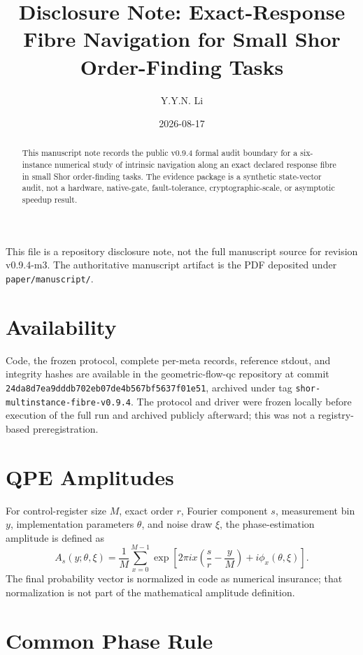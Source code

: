 \documentclass[11pt]{article}
\title{Disclosure Note: Exact-Response Fibre Navigation for Small Shor Order-Finding Tasks}
\author{Y.Y.N. Li}
\date{2026-08-17}
\begin{document}
\maketitle

\noindent This file is a repository disclosure note, not the full manuscript
source for revision v0.9.4-m3. The authoritative manuscript artifact is the
PDF deposited under \texttt{paper/manuscript/}.

\begin{abstract}
This manuscript note records the public v0.9.4 formal audit boundary for a
six-instance numerical study of intrinsic navigation along an exact declared
response fibre in small Shor order-finding tasks. The evidence package is a
synthetic state-vector audit, not a hardware, native-gate, fault-tolerance,
cryptographic-scale, or asymptotic speedup result.
\end{abstract}

\section{Availability}

Code, the frozen protocol, complete per-meta records, reference stdout, and
integrity hashes are available in the geometric-flow-qc repository at commit
\texttt{24da8d7ea9dddb702eb07de4b567bf5637f01e51}, archived under tag
\texttt{shor-multinstance-fibre-v0.9.4}. The protocol and driver were frozen
locally before execution of the full run and archived publicly afterward; this
was not a registry-based preregistration.

\section{QPE Amplitudes}

For control-register size \(M\), exact order \(r\), Fourier component \(s\),
measurement bin \(y\), implementation parameters \(\theta\), and noise draw
\(\xi\), the phase-estimation amplitude is defined as
\[
A_s(y;\theta,\xi)=
\frac{1}{M}\sum_{x=0}^{M-1}
\exp\left[
2\pi i x\left(\frac{s}{r}-\frac{y}{M}\right)
+ i\phi_x(\theta,\xi)
\right].
\]
The final probability vector is normalized in code as numerical insurance;
that normalization is not part of the mathematical amplitude definition.

\section{Common Phase Rule}
\end{document}
